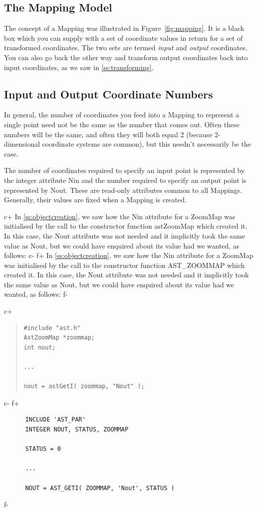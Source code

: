 \documentclass[twoside,11pt]{article}
\newcommand{\secref}[1]{\S\ref{#1}}
\renewcommand{\secref}[1]{\ref{#1}}
\begin{document}
\subsection{The Mapping Model}

The concept of a Mapping was illustrated in Figure~\ref{fig:mapping}.
It is a black box which you can supply with a set of coordinate values
in return for a set of transformed coordinates. The two sets are
termed {\em{input}} and {\em{output}} coordinates. You can also go
back the other way and transform output coordinates back into input
coordinates, as we saw in \secref{ss:transforming}.

\subsection{Input and Output Coordinate Numbers}

In general, the number of coordinates you feed into a Mapping to
represent a single point need not be the same as the number that comes
out. Often these numbers will be the same, and often they will both
equal 2 (because 2-dimensional coordinate systems are common), but
this needn't necessarily be the case.

The number of coordinates required to specify an input point is
represented by the integer attribute Nin and the number required to
specify an output point is represented by Nout. These are read-only
attributes common to all Mappings. Generally, their values are fixed
when a Mapping is created.

c+
In \secref{ss:objectcreation}, we saw how the Nin attribute for a
ZoomMap was initialised by the call to the constructor function
astZoomMap which created it. In this case, the Nout attribute was not
needed and it implicitly took the same value as Nout, but we could
have enquired about its value had we wanted, as follows:
c-
f+
In \secref{ss:objectcreation}, we saw how the Nin attribute for a
ZoomMap was initialised by the call to the constructor function
AST\_ZOOMMAP which created it. In this case, the Nout attribute was
not needed and it implicitly took the same value as Nout, but we could
have enquired about its value had we wanted, as follows:
f-

c+
\begin{quote}
\small
\begin{verbatim}
#include "ast.h"
AstZoomMap *zoommap;
int nout;

...

nout = astGetI( zoommap, "Nout" );
\end{verbatim}
\normalsize
\end{quote}
c-
f+
\small
\begin{verbatim}
      INCLUDE 'AST_PAR'
      INTEGER NOUT, STATUS, ZOOMMAP

      STATUS = 0

      ...

      NOUT = AST_GETI( ZOOMMAP, 'Nout', STATUS )
\end{verbatim}
\normalsize
f-
\end{document}
